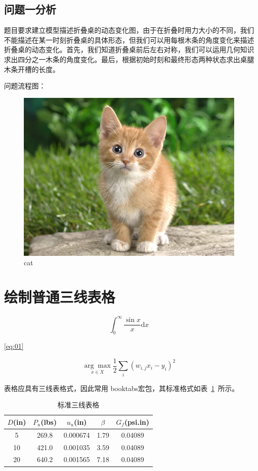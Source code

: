 \documentclass{cumcmthesis}
\begin{document}
\subsection{问题一分析}
题目要求建立模型描述折叠桌的动态变化图，由于在折叠时用力大小的不同，我们不能描述在某一时刻折叠桌的具体形态，但我们可以用每根木条的角度变化来描述折叠桌的动态变化。首先，我们知道折叠桌前后左右对称，我们可以运用几何知识求出四分之一木条的角度变化。最后，根据初始时刻和最终形态两种状态求出桌腿木条开槽的长度。




问题流程图：
\begin{figure}[!h]
\centering
\includegraphics[width=.6\textwidth]{pictures/cat.jpg}
\caption{cat}
\end{figure}

\section{绘制普通三线表格}
\lipsum[2]

\begin{equation}\label{eq:01}
\int_0^{\infty}\frac{\sin x}{x}\mathrm{d}x
\end{equation}

\ref{eq:01}{}

\[
\underset{x\in X}{\arg \max} \frac{1}{2}\sum_i (w_{i,j}x_i - y_i)^2
\]


表格应具有三线表格式，因此常用 booktabs宏包，其标准格式如表~\ref{tab001}~所示。
\begin{table}[!htbp]
\caption{标准三线表格}\label{tab001} \centering
\begin{tabular}{ccccc}
\toprule[1.5pt]
$D$(in) & $P_u$(lbs) & $u_u$(in) & $\beta$ & $G_f$(psi.in)\\
\midrule[1pt]
 5 & 269.8 & 0.000674 & 1.79 & 0.04089\\
10 & 421.0 & 0.001035 & 3.59 & 0.04089\\
20 & 640.2 & 0.001565 & 7.18 & 0.04089\\
\bottomrule[1.5pt]
\end{tabular}
\end{table}
\end{document}
